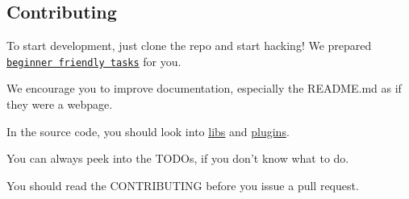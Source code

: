 \subsection*{Contributing}

To start development, just clone the repo and start hacking! We prepared \href{https://github.com/ElektraInitiative/libelektra/issues?q=is%3Aissue+is%3Aopen+label%3A%22beginner+friendly%22}{\tt beginner friendly tasks} for you.


\begin{DoxyItemize}
\item We encourage you to improve documentation, especially the R\+E\+A\+D\+M\+E.\+md as if they were a webpage.
\item In the source code, you should look into \hyperlink{md_src_libs_README_src_libs_README_md}{libs} and \hyperlink{md_src_plugins_README_src_plugins_README_md}{plugins}.
\item You can always peek into the T\+O\+D\+Os, if you don't know what to do.
\item You should read the C\+O\+N\+T\+R\+I\+B\+U\+T\+I\+N\+G before you issue a pull request. 
\end{DoxyItemize}